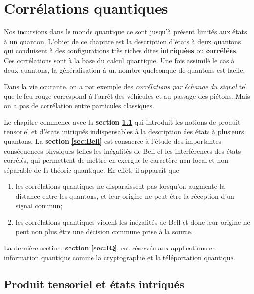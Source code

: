 
\chapter{Corrélations quantiques}

\minitoc

\bigskip

Nos incursions dans le monde quantique ce sont jusqu'à présent limités aux états
à un quanton. L'objet de ce chapitre est la description d'états à deux quantons
qui conduisent à des configurations très riches dites \textbf{intriquées} ou
\textbf{corrélées}. Ces corrélations sont à la base du calcul quantique. Une
fois assimilé le cas à deux quantons, la généralisation à un nombre quelconque
de quantons est facile.

Dans la vie courante, on a par exemple des \emph{corrélations par échange du
signal} tel que le feu rouge correspond à l'arrêt des véhicules et au passage
des piétons. Mais on a pas de corrélation entre particules classiques.

Le chapitre commence avec la \textbf{section \ref{sec:ProdTen}} qui introduit
les notions de produit tensoriel et d'états intriqués indispensables à la
description des états à plusieurs quantons. La \textbf{section \ref{sec:Bell}}
est consacrée à l'étude des importantes conséquences physiques telles les
inégalités de Bell et les interférences des états corrélés, qui permettent de
mettre en exergue le caractère non local et non séparable de la théorie
quantique. En effet, il apparaît que
\begin{enumerate}
\item les corrélations quantiques ne disparaissent pas lorsqu'on augmente la
distance entre les quantons, et leur origine ne peut être la réception d'un
signal commun;

\item les corrélations quantiques violent les inégalités de Bell et donc leur
origine ne peut non plus être une décision commune prise à la source.
\end{enumerate}

La dernière section, \textbf{section \ref{sec:IQ}}, est réservée aux
applications en information quantique comme la cryptographie et la téléportation
quantique.

\section{Produit tensoriel et états intriqués}
\label{sec:ProdTen}

